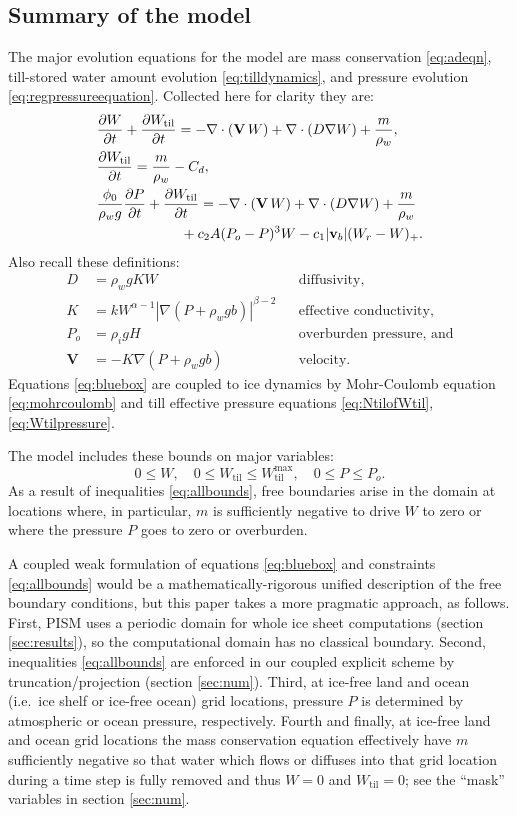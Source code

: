 \documentclass[gmd]{copernicus}   %
\newcommand{\text}{\textrm}
\newcommand\bv{\mathbf{v}}
\newcommand\bV{\mathbf{V}}
\newcommand{\ddt}[1]{\ensuremath{\frac{\partial #1}{\partial t}}}
\newcommand{\Div}{\nabla\cdot}
\newcommand{\grad}{\nabla}
\newcommand{\Wtil}{W_{\text{til}}}
\newcommand{\Wtilmax}{W_{\text{til}}^{\text{max}}}
\begin{document}
\subsection{Summary of the model}  The major evolution equations for the model are mass conservation \eqref{eq:adeqn}, till-stored water amount evolution \eqref{eq:tilldynamics}, and pressure evolution \eqref{eq:regpressureequation}.  Collected here for clarity they are:
\begin{align}
&\ddt{W} + \ddt{\Wtil} = - \Div\left(\bV\, W\right) + \Div \left(D \grad W\right) + \frac{m}{\rho_w}, \label{eq:bluebox} \\
&\frac{\partial \Wtil}{\partial t} = \frac{m}{\rho_w} - C_d, \notag \\
&\frac{\phi_0}{\rho_w g} \ddt{P} + \ddt{\Wtil} = - \Div\left(\bV\, W\right) + \Div \left(D \grad W\right) + \frac{m}{\rho_w} \notag \\
& \qquad \qquad \qquad + c_2 A (P_o - P)^3 W - c_1 |\bv_b| (W_r - W)_+. \notag
\end{align}
Also recall these definitions:
\begin{align*}
D    &= \rho_w g K W && \text{diffusivity,} \\
K    &= k W^{\alpha-1} \left|\grad(P+\rho_w g b)\right|^{\beta-2} && \text{effective conductivity,} \\
P_o  &= \rho_i g H && \text{overburden pressure, and} \\
\bV  &= - K \grad\left(P + \rho_w g b\right) && \text{velocity}.
\end{align*}
Equations \eqref{eq:bluebox} are coupled to ice dynamics by Mohr-Coulomb equation \eqref{eq:mohrcoulomb} and till effective pressure equations \eqref{eq:NtilofWtil}, \eqref{eq:Wtilpressure}.

The model includes these bounds on major variables:
\begin{equation}
0\le W, \quad 0\le \Wtil \le \Wtilmax, \quad 0 \le P \le P_o.  \label{eq:allbounds}
\end{equation}
As a result of inequalities \eqref{eq:allbounds}, free boundaries arise in the domain at locations where, in particular, $m$ is sufficiently negative to drive $W$ to zero or where the pressure $P$ goes to zero or overburden.

A coupled weak formulation of equations \eqref{eq:bluebox} and constraints \eqref{eq:allbounds} would be a mathematically-rigorous unified description of the free boundary conditions, but this paper takes a more pragmatic approach, as follows.  First, PISM uses a periodic domain for whole ice sheet computations (section \ref{sec:results}), so the computational domain has no classical boundary.  Second, inequalities \eqref{eq:allbounds} are enforced in our coupled explicit scheme by truncation/projection (section \ref{sec:num}).  Third, at ice-free land and ocean (i.e.~ice shelf or ice-free ocean) grid locations, pressure $P$ is determined by atmospheric or ocean pressure, respectively.  Fourth and finally, at ice-free land and ocean grid locations the mass conservation equation effectively have $m$ sufficiently negative so that water which flows or diffuses into that grid location during a time step is fully removed and thus $W=0$ and $\Wtil=0$; see the ``mask'' variables in section \ref{sec:num}.
\end{document}
